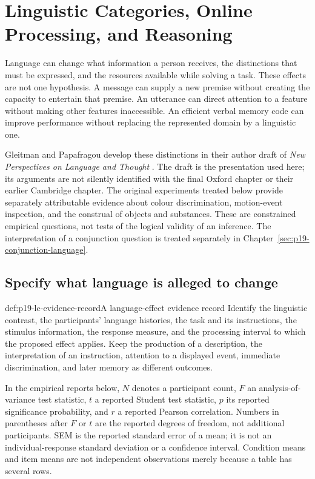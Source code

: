 \chapter{Linguistic Categories, Online Processing, and Reasoning}
\label{sec:p19-language-categories}

Language can change what information a person receives, the distinctions
that must be expressed, and the resources available while solving a task.
These effects are not one hypothesis. A message can supply a new premise
without creating the capacity to entertain that premise. An utterance can
direct attention to a feature without making other features inaccessible.
An efficient verbal memory code can improve performance without replacing
the represented domain by a linguistic one.

Gleitman and Papafragou develop these distinctions in their author draft
of \emph{New Perspectives on Language and Thought}
\cite[author-draft pp.~3--17,56--61]{GleitmanPapafragouLanguageThoughtAuthorDraftLC}.
The draft is the presentation used here; its arguments are not silently
identified with the final Oxford chapter or their earlier Cambridge chapter.
The original experiments treated below provide separately attributable
evidence about colour discrimination, motion-event inspection, and the
construal of objects and substances. These are constrained empirical
questions, not tests of the logical validity of an inference.
The interpretation of a conjunction question is treated separately in
Chapter~\ref{sec:p19-conjunction-language}.

\section{Specify what language is alleged to change}
\label{sec:p19-lc-claims}

\begin{hbdefinition}{def:p19-lc-evidence-record}{A language-effect evidence record}
Identify the linguistic contrast, the participants' language histories,
the task and its instructions, the stimulus information, the response
measure, and the processing interval to which the proposed effect applies.
Keep the production of a description, the interpretation of an instruction,
attention to a displayed event, immediate discrimination, and later memory
as different outcomes.

In the empirical reports below, \(N\) denotes a participant count, \(F\)
an analysis-of-variance test statistic, \(t\) a reported Student test
statistic, \(p\) its reported significance probability, and \(r\) a
reported Pearson correlation. Numbers in parentheses after \(F\) or \(t\)
are the reported degrees of freedom, not additional participants.
SEM is the reported standard error of a mean;
it is not an individual-response standard deviation or a confidence interval.
Condition means and item means are not independent observations merely
because a table has several rows.
\end{hbdefinition}

